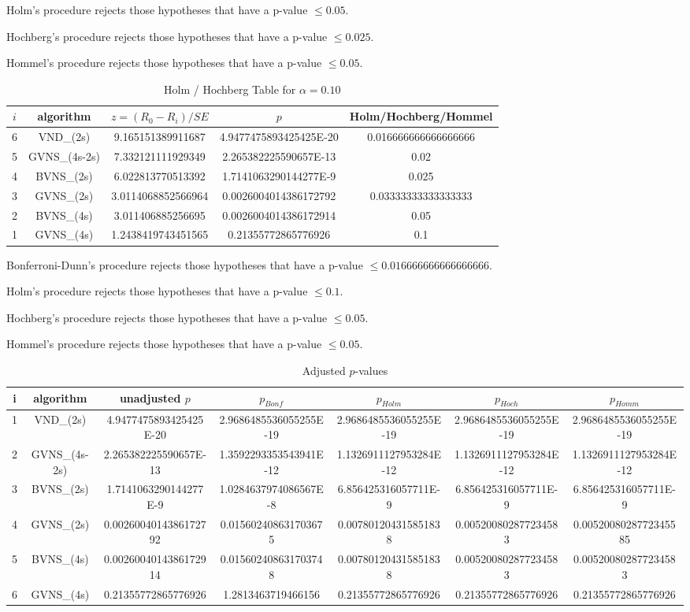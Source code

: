 \documentclass[a4paper,10pt]{article}
\begin{document}
\begin{landscape}
Holm's procedure rejects those hypotheses that have a p-value $\le0.05$.


Hochberg's procedure rejects those hypotheses that have a p-value $\le0.025$.


Hommel's procedure rejects those hypotheses that have a p-value $\le0.05$.


\begin{table}[!htp]
\centering\tiny
\caption{Holm / Hochberg Table for $\alpha=0.10$}
\begin{tabular}{ccccc}
$i$&algorithm&$z=(R_0 - R_i)/SE$&$p$&Holm/Hochberg/Hommel\\
\hline
6&VND_(2s)&9.165151389911687&4.9477475893425425E-20&0.016666666666666666\\
5&GVNS_(4s-2s)&7.332121111929349&2.265382225590657E-13&0.02\\
4&BVNS_(2s)&6.022813770513392&1.7141063290144277E-9&0.025\\
3&GVNS_(2s)&3.0114068852566964&0.0026004014386172792&0.03333333333333333\\
2&BVNS_(4s)&3.011406885256695&0.0026004014386172914&0.05\\
1&GVNS_(4s)&1.2438419743451565&0.21355772865776926&0.1\\
\hline
\end{tabular}
\end{table}
Bonferroni-Dunn's procedure rejects those hypotheses that have a p-value $\le0.016666666666666666$.


Holm's procedure rejects those hypotheses that have a p-value $\le0.1$.


Hochberg's procedure rejects those hypotheses that have a p-value $\le0.05$.


Hommel's procedure rejects those hypotheses that have a p-value $\le0.05$.


\begin{table}[!htp]
\centering\tiny
\caption{Adjusted $p$-values}
\begin{tabular}{ccccccc}
i&algorithm&unadjusted $p$&$p_{Bonf}$&$p_{Holm}$&$p_{Hoch}$&$p_{Homm}$\\
\hline
1&VND_(2s)&4.9477475893425425E-20&2.9686485536055255E-19&2.9686485536055255E-19&2.9686485536055255E-19&2.9686485536055255E-19\\
2&GVNS_(4s-2s)&2.265382225590657E-13&1.3592293353543941E-12&1.1326911127953284E-12&1.1326911127953284E-12&1.1326911127953284E-12\\
3&BVNS_(2s)&1.7141063290144277E-9&1.0284637974086567E-8&6.856425316057711E-9&6.856425316057711E-9&6.856425316057711E-9\\
4&GVNS_(2s)&0.0026004014386172792&0.015602408631703675&0.007801204315851838&0.005200802877234583&0.0052008028772345585\\
5&BVNS_(4s)&0.0026004014386172914&0.015602408631703748&0.007801204315851838&0.005200802877234583&0.005200802877234583\\
6&GVNS_(4s)&0.21355772865776926&1.2813463719466156&0.21355772865776926&0.21355772865776926&0.21355772865776926\\
\hline
\end{tabular}
\end{table}


\end{landscape}
\end{document}
